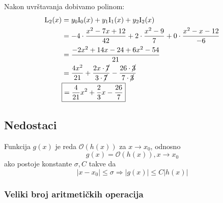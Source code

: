 \begin{multicols}{2}

\vspace*{0pt}

Nakon uvrštavanja dobivamo polinom:
\begin{align*}
\mathrm{L}_2(x) &= y_0\mathrm{I}_0(x) + y_1\mathrm{I}_1(x) + y_2\mathrm{I}_2(x)\\
&= -4\cdot\frac{x^2-7x+12}{42} + 2\cdot\frac{x^2-9}{7} + 0\cdot\frac{x^2-x-12}{-6}\\
&= \frac{-2x^2+14x-24+6x^2-54}{21}\\
&= \frac{4x^2}{21} + \frac{2x\cdot\cancel{7}}{3\cdot\cancel{7}} - \frac{26\cdot\cancel{3}}{7\cdot\cancel{3}}\\
&\boxed{= {\frac{4}{21}}x^2 + {\frac{2}{3}}x - {\frac{26}{7}}}
\end{align*}

\vspace*{0pt}

\newcolumn

\vspace*{0pt}


\end{multicols}

\subsection{Nedostaci}

\begin{definition}
    Funkcija $g(x)$ je reda $\mathcal{O}(h(x))$ za $x \to x_0$, odnosno
    $$
    g(x) = \mathcal{O}(h(x)), x\to x_0
    $$
    ako postoje konstante $\sigma, C$ takve da
    $$
    |x-x_0| \leq \sigma \Rightarrow |g(x)| \leq C|h(x)|
    $$
\end{definition}

\subsubsection{Veliki broj aritmetičkih operacija}

